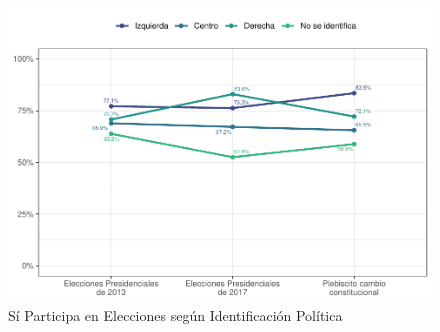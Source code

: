 \documentclass[
  12pt,
]{book}
\begin{document}
\begin{figure}

{\centering \includegraphics{reporte-elsoc_files/figure-latex/particip-elect-id-1} 

}

\caption{Sí Participa en Elecciones según Identificación Política}\label{fig:particip-elect-id}
\end{figure}
\end{document}
